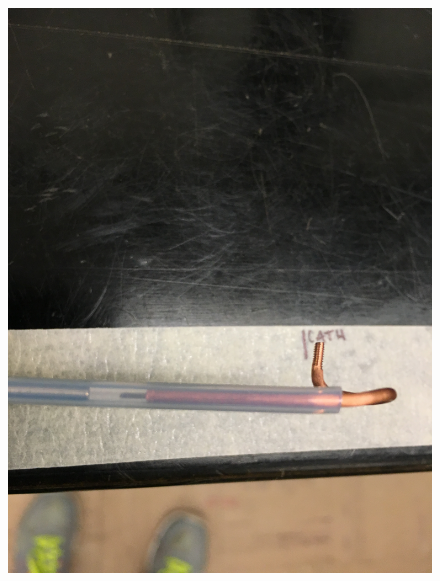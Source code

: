 \begin{figure}[htbp]
    \begin{minipage}{0.47\textwidth}
    \includegraphics[width=\linewidth, angle=270]{figures/testbed/ft5_3.jpg}
    \end{minipage}
    \hspace{\fill} %
    \begin{minipage}{0.47\textwidth}

\end{minipage}
\end{figure}
